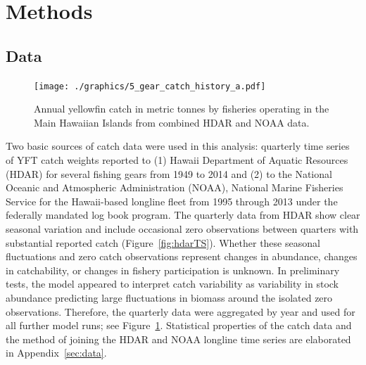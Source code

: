 \documentclass[12pt,letterpaper,twoside]{article}
\begin{document}
\section{Methods}
\subsection{Data}
\begin{figure}
\begin{center}
\texttt{[image: ./graphics/5\_gear\_catch\_history\_a.pdf]}
\caption{\label{fig:annualTS}
Annual yellowfin catch in metric tonnes by fisheries
operating in the Main Hawaiian Islands from combined HDAR and NOAA data.
}
\end{center}
\end{figure}

Two basic sources of catch data were used in this analysis:
quarterly time series of YFT catch weights reported to (1)
Hawaii Department of Aquatic Resources (HDAR) for several fishing
gears from 1949 to 2014 and (2)
to the National Oceanic and Atmospheric Administration (NOAA), National
Marine Fisheries Service for the Hawaii-based longline fleet
from 1995 through 2013 under the federally mandated log book program.  The quarterly data from HDAR show clear seasonal variation and include
occasional zero observations between quarters with substantial
reported catch (Figure~\ref{fig:hdarTS}).
Whether these seasonal fluctuations and zero
catch observations represent changes in abundance, changes in
catchability, or changes in
fishery participation is unknown. In preliminary tests, the model appeared to
interpret catch variability as variability in stock abundance
predicting large fluctuations in biomass around the isolated zero
observations. Therefore, the quarterly data were aggregated by year
and used for all further model runs; see Figure~\ref{fig:annualTS}.
Statistical properties of the catch data and the method of joining the
HDAR and NOAA longline time series are elaborated in
Appendix~\ref{sec:data}. 
\end{document}
